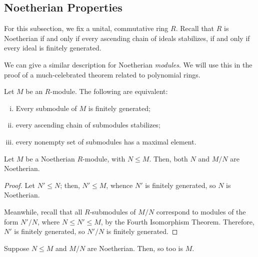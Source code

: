 \documentclass[10pt]{mypackage}
\begin{document}
\subsection{Noetherian Properties}%
For this subsection, we fix a unital, commutative ring $R$. Recall that $R$ is Noetherian if and only if every ascending chain of ideals stabilizes, if and only if every ideal is finitely generated.%

We can give a similar description for Noetherian \textit{modules}. We will use this in the proof of a much-celebrated theorem related to polynomial rings.
\begin{proposition}
  Let $M$ be an $R$-module. The following are equivalent:
  \begin{enumerate}[(i)]
    \item Every submodule of $M$ is finitely generated;
    \item every ascending chain of submodules stabilizes;
    \item every nonempty set of submodules has a maximal element.
  \end{enumerate}
\end{proposition}
\begin{proposition}
  Let $M$ be a Noetherian $R$-module, with $N\leq M$. Then, both $N$ and $M/N$ are Noetherian.
\end{proposition}
\begin{proof}
  Let $N'\leq N$; then, $N'\leq M$, whence $N'$ is finitely generated, so $N$ is Noetherian.%

  Meanwhile, recall that all $R$-submodules of $M/N$ correspond to modules of the form $N'/N$, where $N\leq N'\leq M$, by the Fourth Isomorphism Theorem. Therefore, $N'$ is finitely generated, so $N'/N$ is finitely generated.
\end{proof}
\begin{proposition}
  Suppose $N\leq M$ and $M/N$ are Noetherian. Then, so too is $M$.
\end{proposition}
\end{document}

